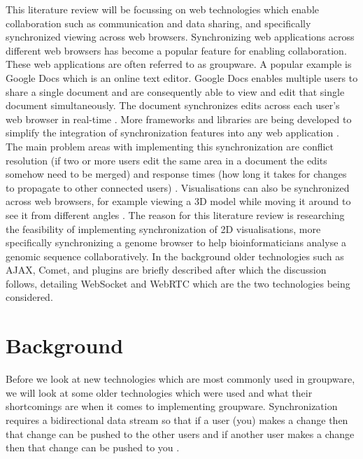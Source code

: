 \documentclass[prodmode,acmtecs]{acmsmall}
\begin{document}
This literature review will be focussing on web technologies which enable collaboration such as communication and data sharing, and specifically synchronized viewing across web browsers. Synchronizing web applications across different web browsers has become a popular feature for enabling collaboration. These web applications are often referred to as groupware. A popular example is Google Docs which is an online text editor. Google Docs enables multiple users to share a single document and are consequently able to view and edit that single document simultaneously. The document synchronizes edits across each user's web browser in real-time \cite{koren2013shared}. More frameworks and libraries are being developed to simplify the integration of synchronization features into any web application \cite{ozono2012real}. The main problem areas with implementing this synchronization are conflict resolution (if two or more users edit the same area in a document the edits somehow need to be merged) and response times (how long it takes for changes to propagate to other connected users) \cite{heinrich2012enriching}. Visualisations can also be synchronized across web browsers, for example viewing a 3D model while moving it around to see it from different angles \cite{marion2012real}. The reason for this literature review is researching the feasibility of implementing synchronization of 2D visualisations, more specifically synchronizing a genome browser to help bioinformaticians analyse a genomic sequence collaboratively. In the background older technologies such as AJAX, Comet, and plugins are briefly described after which the discussion follows, detailing WebSocket and WebRTC which are the two technologies being considered.  

\section{Background}
Before we look at new technologies which are most commonly used in groupware, we will look at some older technologies which were used and what their shortcomings are when it comes to implementing groupware. Synchronization requires a bidirectional data stream so that if a user (you) makes a change then that change can be pushed to the other users and if another user makes a change then that change can be pushed to you \cite{linner2012instant}.
\end{document}
